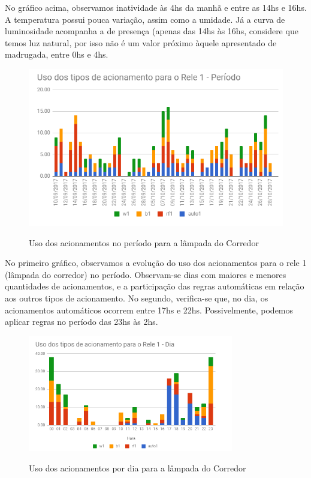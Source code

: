 No gráfico acima, observamos inatividade às 4hs da manhã e entre as 14hs e 16hs. A temperatura possui pouca variação, assim como a umidade. Já a curva de luminosidade acompanha a de presença (apenas das 14hs às 16hs, considere que temos luz natural, por isso não é um valor próximo àquele apresentado de madrugada, entre 0hs e 4hs.

\begin{figure}[H]
	\centering
	\caption{Uso dos acionamentos no período para a lâmpada do Corredor}
	\includegraphics[width=1.0\textwidth]{UsoRele1periodoCorredor}
	\label{fig:UsoRele1periodoCorredor}
\end{figure}

No primeiro gráfico, observamos a evolução do uso dos acionamentos para o rele 1 (lâmpada do corredor) no período. Observam-se dias com maiores e menores quantidades de acionamentos, e a participação das regras automáticas em relação aos outros tipos de acionamento. No segundo, verifica-se que, no dia, os acionamentos automáticos ocorrem entre 17hs e 22hs. Possivelmente, podemos aplicar regras no período das 23hs às 2hs.

\begin{figure}[H]
	\centering
	\caption{Uso dos acionamentos por dia para a lâmpada do Corredor}
	\includegraphics[width=0.8\textwidth]{UsoRele1DiaCorredor}
	\label{fig:UsoRele1DiaCorredor}
\end{figure}

